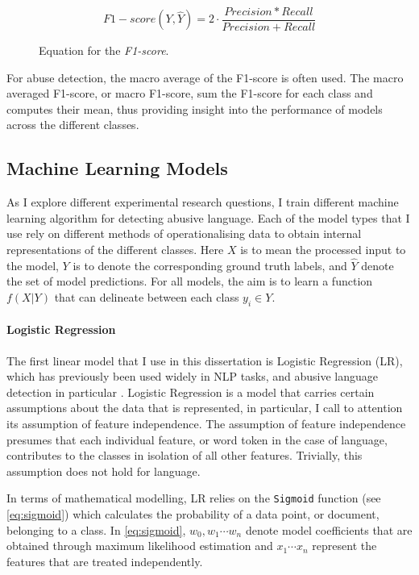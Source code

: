 \begin{figure}[h]
  \begin{equation}\label{eq:f1score}
    F1-score(Y,\hat{Y}) = 2\cdot\frac{Precision * Recall}{Precision + Recall}
  \end{equation}
  \caption{Equation for the \textit{F1-score}.}
\end{figure}

For abuse detection, the macro average of the F1-score is often used. The macro averaged F1-score, or macro F1-score, sum the F1-score for each class and computes their mean, thus providing insight into the performance of models across the different classes.

\subsection{Machine Learning Models}

As I explore different experimental research questions, I train different machine learning algorithm for detecting abusive language. Each of the model types that I use rely on different methods of operationalising data to obtain internal representations of the different classes. Here $X$ is to mean the processed input to the model, $Y$ is to denote the corresponding ground truth labels, and $\hat{Y}$ denote the set of model predictions. For all models, the aim is to learn a function $f(X|Y)$ that can delineate between each class $y_i\in Y$.

\paragraph{Logistic Regression}
The first linear model that I use in this dissertation is Logistic Regression (LR), which has previously been used widely in NLP tasks, and abusive language detection in particular \citep{LR papers}. Logistic Regression is a model that carries certain assumptions about the data that is represented, in particular, I call to attention its assumption of feature independence. The assumption of feature independence presumes that each individual feature, or word token in the case of language, contributes to the classes in isolation of all other features. Trivially, this assumption does not hold for language.

In terms of mathematical modelling, LR relies on the \texttt{Sigmoid} function (see \ref{eq:sigmoid}) which calculates the probability of a data point, or document, belonging to a class. In \cref{eq:sigmoid}, $w_0, w_1 \cdots w_n$ denote model coefficients that are obtained through maximum likelihood estimation and $x_1 \cdots x_n$ represent the features that are treated independently.

